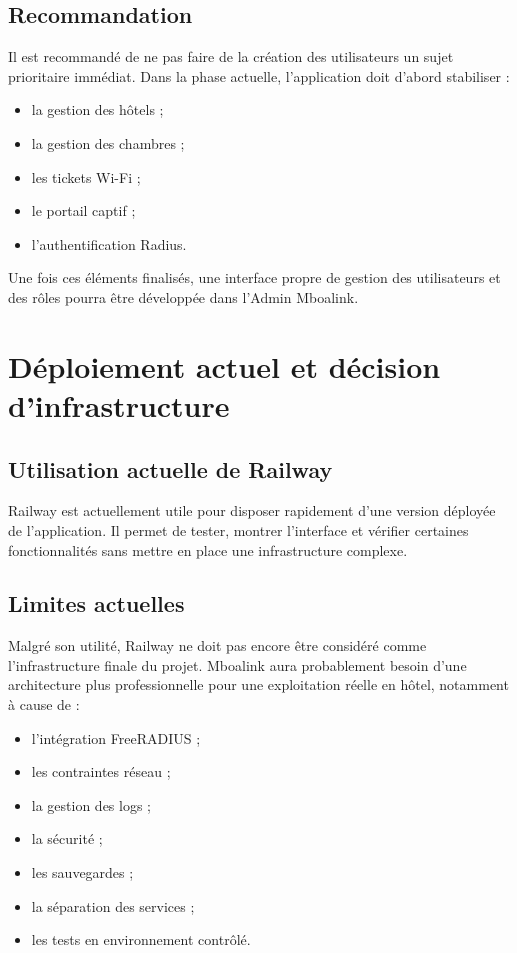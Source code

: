 \documentclass[12pt,a4paper]{article}
\begin{document}
\subsection{Recommandation}

Il est recommandé de ne pas faire de la création des utilisateurs un sujet prioritaire immédiat. Dans la phase actuelle, l'application doit d'abord stabiliser :

\begin{itemize}
  \item la gestion des hôtels ;
  \item la gestion des chambres ;
  \item les tickets Wi-Fi ;
  \item le portail captif ;
  \item l'authentification Radius.
\end{itemize}

Une fois ces éléments finalisés, une interface propre de gestion des utilisateurs et des rôles pourra être développée dans l'Admin Mboalink.

\section{Déploiement actuel et décision d'infrastructure}

\subsection{Utilisation actuelle de Railway}

Railway est actuellement utile pour disposer rapidement d'une version déployée de l'application. Il permet de tester, montrer l'interface et vérifier certaines fonctionnalités sans mettre en place une infrastructure complexe.

\subsection{Limites actuelles}

Malgré son utilité, Railway ne doit pas encore être considéré comme l'infrastructure finale du projet. Mboalink aura probablement besoin d'une architecture plus professionnelle pour une exploitation réelle en hôtel, notamment à cause de :

\begin{itemize}
  \item l'intégration FreeRADIUS ;
  \item les contraintes réseau ;
  \item la gestion des logs ;
  \item la sécurité ;
  \item les sauvegardes ;
  \item la séparation des services ;
  \item les tests en environnement contrôlé.
\end{itemize}
\end{document}
